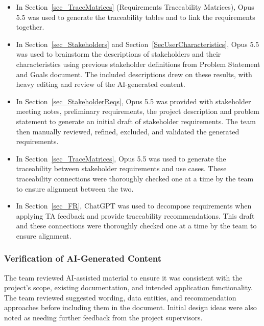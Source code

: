 \documentclass[10pt]{article}
\begin{document}
\begin{itemize}
    \item In Section~\ref{sec_TraceMatrices} (Requirements Traceability
    Matrices), Opus 5.5 was used to generate the traceability tables and to
    link the requirements together.

    \item In Section~\ref{sec_Stakeholders} and Section~\ref{SecUserCharacteristics}, Opus 
    5.5 was used to brainstorm the descriptions of stakeholders and their characteristics 
    using previous stakeholder definitions from Problem Statement and Goals document. The included descriptions drew on these results, with heavy editing and review
    of the AI-generated content.

    \item In Section~\ref{sec_StakeholderReqs}, Opus 5.5 was provided with stakeholder 
    meeting notes, preliminary requirements, the project description and problem statement 
    to generate an initial draft of stakeholder requirements. The team then manually reviewed, 
    refined, excluded, and validated the generated requirements.

    \item In Section~\ref{sec_TraceMatrices}, Opus 5.5 was used to generate the traceability 
    between stakeholder requirements and use cases. These traceability connections were thoroughly 
    checked one at a time by the team to ensure alignment between the two.

    \item In Section~\ref{sec_FR}, ChatGPT was used to decompose requirements when applying TA feedback 
    and provide traceability recommendations. This draft and these connections were thoroughly checked 
    one at a time by the team to ensure alignment.

\end{itemize}

\subsubsection*{Verification of AI-Generated Content}

The team reviewed AI-assisted material to ensure it was
consistent with the project's scope, existing documentation,
and intended application functionality. The team reviewed suggested 
wording, data entities, and recommendation approaches before including 
them in the document. Initial design ideas were also noted as needing 
further feedback from the project supervisors.
\end{document}
